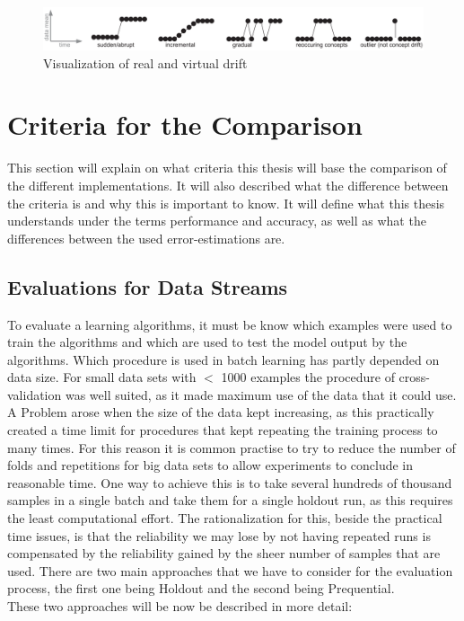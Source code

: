 \documentclass[12pt,oneside,a4paper,parskip]{scrbook}
\begin{document}
\begin{figure}[H]
  \centering
  \includegraphics[width=\columnwidth]{Concept_2}
  \caption{Visualization of real and virtual drift \cite{ConceptDrift}} 
  \label{fig:concept_2}
\end{figure}

\cite{ConceptDrift}

\section{Criteria for the Comparison}

This section will explain on what criteria this thesis will base the comparison of the different implementations. 
It will also described what the difference between the criteria is and why this is important to know.
It will define what this thesis understands under the terms performance and accuracy, as well as what the differences
between the used error-estimations are.

\subsection{Evaluations for Data Streams}
To evaluate a learning algorithms, it must be know which examples were used to train the algorithms and which are used to 
test the model output by the algorithms. Which procedure is used in batch learning has partly depended on data size.
For small data sets with $<$ 1000 examples the procedure of cross-validation was well suited, as it made maximum use of the
data that it could use.
A Problem arose when the size of the data kept increasing, as this practically created a time limit for procedures that kept
repeating the training process to many times.
For this reason it is common practise to try to reduce the number of folds and repetitions for big data sets to allow experiments
to conclude in reasonable time. 
One way to achieve this is to take several hundreds of thousand samples in a single batch and take them for a single holdout run,
as this requires the least computational effort. The rationalization for this, beside the practical time issues, is that the 
reliability we may lose by not having repeated runs is compensated by the reliability gained by the sheer number of samples that are used. 
There are two main approaches that we have to consider for the evaluation process, the first one being Holdout and the second being 
Prequential. \cite{Bifet_datastream} \\
These two approaches will be now be described in more detail:
\end{document}
